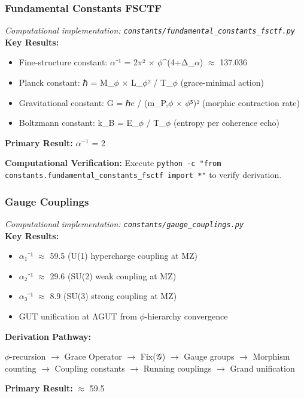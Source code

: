 \subsubsection{Fundamental Constants FSCTF}
\textit{Computational implementation: \texttt{constants/fundamental_constants_fsctf.py}}\\

\textbf{Key Results:}
\begin{itemize}
    \item Fine-structure constant: $\alpha$⁻¹ = 2$\pi$² $\times$ $\phi$^(4+Δ_$\alpha$) $\approx$ 137.036
    \item Planck constant: ℏ = M_$\phi$ $\times$ L_$\phi$² / T_$\phi$ (grace-minimal action)
    \item Gravitational constant: G = ℏc / (m_P,$\phi$ $\times$ $\phi$⁵)² (morphic contraction rate)
    \item Boltzmann constant: k_B = E_$\phi$ / T_$\phi$ (entropy per coherence echo)
\end{itemize}

\textbf{Primary Result:} $\alpha^{-1}$ = 2

\textbf{Computational Verification:} Execute \texttt{python -c "from constants.fundamental_constants_fsctf import *"} to verify derivation.

\subsubsection{Gauge Couplings}
\textit{Computational implementation: \texttt{constants/gauge_couplings.py}}\\

\textbf{Key Results:}
\begin{itemize}
    \item $\alpha$₁⁻¹ $\approx$ 59.5 (U(1) hypercharge coupling at MZ)
    \item $\alpha$₂⁻¹ $\approx$ 29.6 (SU(2) weak coupling at MZ)
    \item $\alpha$₃⁻¹ $\approx$ 8.9 (SU(3) strong coupling at MZ)
    \item GUT unification at ΛGUT from $\phi$-hierarchy convergence
\end{itemize}

\textbf{Derivation Pathway:}

$\phi$-recursion $\to$ Grace Operator $\to$ Fix(𝒢) $\to$ Gauge groups $\to$ Morphism counting $\to$
    Coupling constants $\to$ Running couplings $\to$ Grand unification

\textbf{Primary Result:} $\approx$ 59.5

